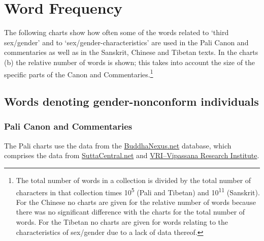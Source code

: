 \section{Word Frequency}
\label{appendix2}

The following charts show how often some of the words related to `third sex/gender' and to `sex/gender-characteristics' are used in the Pali Canon and commentaries as well as in the Sanskrit, Chinese and Tibetan texts. In the charts (b) the relative number of words is shown; this takes into account the size of the specific parts of the Canon and Commentaries.\footnote{The total number of words in a collection is divided by the total number of characters in that collection times 10\textsuperscript{5} (Pali and Tibetan) and 10\textsuperscript{11} (Sanskrit). For the Chinese no charts are given for the relative number of words because there was no significant difference with the charts for the total number of words. For the Tibetan no charts are given for words relating to the characteristics of sex/gender due to a lack of data thereof.}

\captionsetup{justification   = raggedright,
              singlelinecheck = false}

\subsection{Words denoting gender-nonconform individuals}
\label{appendix2a}
\subsubsection*{Pali Canon and Commentaries}

The Pali charts use the data from the \href{https://buddhanexus.net}{BuddhaNexus.net} database, which comprises the data from \href{https://suttacentral.net/}{SuttaCentral.net} and \href{https://tipitaka.org/}{VRI--Vipassana Research Institute}.

